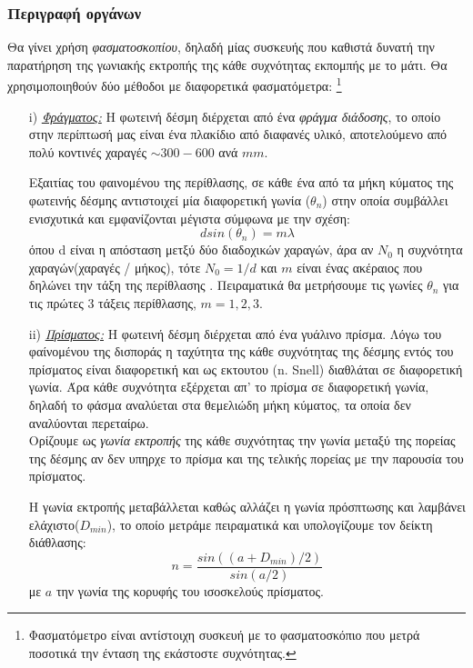 \documentclass[a4paper]{article}
\begin{document}
\subsubsection*{Περιγραφή οργάνων} 
Θα γίνει χρήση \textit{φασματοσκοπίου}, δηλαδή μίας συσκευής που καθιστά δυνατή την παρατήρηση της γωνιακής εκτροπής της κάθε συχνότητας εκπομπής με το μάτι. 
Θα χρησιμοποιηθούν δύο μέθοδοι με διαφορετικά φασματόμετρα: 
\footnote{Φασματόμετρο είναι αντίστοιχη συσκευή με το φασματοσκόπιο που μετρά ποσοτικά την ένταση της εκάστοστε συχνότητας.}
\begin{enumerate}


\item[i)] \underline{\textit{Φράγματος:}}
  Η φωτεινή δέσμη διέρχεται από ένα \textit{φράγμα διάδοσης}, το οποίο στην περίπτωσή μας είναι ένα πλακίδιο από διαφανές υλικό, αποτελούμενο από πολύ κοντινές χαραγές $\sim 300-600$ ανά $mm$. 
  
  Εξαιτίας του φαινομένου της περίθλασης, σε κάθε ένα από τα μήκη κύματος της φωτεινής δέσμης αντιστοιχεί μία διαφορετική γωνία ($\theta_n$) στην οποία συμβάλλει ενισχυτικά και εμφανίζονται μέγιστα σύμφωνα με την σχέση: 
\begin{equation}\label{2}
  dsin(\theta_n ) = m \lambda 
\end{equation}   
   όπου d είναι η απόσταση μετξύ δύο διαδοχικών χαραγών, άρα αν $N_0$ η συχνότητα χαραγών(χαραγές / μήκος), τότε $N_0 = 1/d$ και $m$ είναι ένας ακέραιος που δηλώνει την τάξη της περίθλασης . Πειραματικά θα μετρήσουμε τις γωνίες $\theta_n$ για τις πρώτες 3 τάξεις περίθλασης, $m=1,2,3$.
   
   
   
\item[ii)] \underline{\textit{Πρίσματος:}}
Η φωτεινή δέσμη διέρχεται από ένα γυάλινο πρίσμα. Λόγω του φαίνομένου της δισποράς η ταχύτητα της κάθε συχνότητας της δέσμης εντός του πρίσματος είναι διαφορετική και ως εκτουτου (n. Snell) διαθλάται σε διαφορετική γωνία. Άρα κάθε συχνότητα εξέρχεται απ' το πρίσμα σε διαφορετική γωνία, δηλαδή το φάσμα αναλύεται στα θεμελιώδη μήκη κύματος, τα οποία δεν αναλύονται περεταίρω. \\ 
Ορίζουμε ως \textit{γωνία εκτροπής} της κάθε συχνότητας την γωνία μεταξύ της πορείας της δέσμης αν δεν υπηρχε το πρίσμα και της τελικής πορείας με την παρουσία του πρίσματος. 

Η γωνία εκτροπής μεταβάλλεται καθώς αλλάζει η γωνία πρόσπτωσης και λαμβάνει ελάχιστο($D_{min}$), το οποίο μετράμε πειραματικά και υπολογίζουμε τον δείκτη διάθλασης: 
\begin{equation}\label{3}
  n= \frac{sin\left( (a+D_{min})/2 \right) }{sin(a/2)}
\end{equation}
με $a$ την γωνία της κορυφής του ισοσκελούς πρίσματος.
\end{enumerate}
\end{document}
